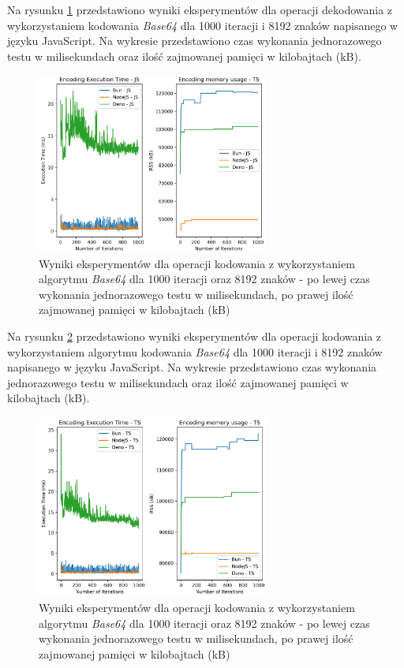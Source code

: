 Na rysunku \ref{fig:decoding_e2_js} przedstawiono wyniki eksperymentów dla operacji dekodowania z wykorzystaniem kodowania \textit{Base64} dla 1000 iteracji i 8192 znaków napisanego w języku JavaScript. Na wykresie przedstawiono czas wykonania jednorazowego testu w milisekundach oraz ilość zajmowanej pamięci w kilobajtach (kB).

\begin{figure}[H]
  \centering
  \includegraphics[width=0.68\textwidth]{Figures/coding/base64_1000_encoding_js.png}
  \caption{Wyniki eksperymentów dla operacji kodowania z wykorzystaniem algorytmu \textit{Base64} dla 1000 iteracji oraz 8192 znaków - po lewej czas wykonania jednorazowego testu w milisekundach, po prawej ilość zajmowanej pamięci w kilobajtach (kB)}
  \label{fig:decoding_e2_js}
\end{figure}

Na rysunku \ref{fig:encoding_e2_ts} przedstawiono wyniki eksperymentów dla operacji kodowania z wykorzystaniem algorytmu kodowania \textit{Base64} dla 1000 iteracji i 8192 znaków napisanego w języku JavaScript. Na wykresie przedstawiono czas wykonania jednorazowego testu w milisekundach oraz ilość zajmowanej pamięci w kilobajtach (kB).

\begin{figure}[H]
  \centering
  \includegraphics[width=0.68\textwidth]{Figures/coding/base64_1000_encoding_ts.png}
  \caption{Wyniki eksperymentów dla operacji kodowania z wykorzystaniem algorytmu \textit{Base64} dla 1000 iteracji oraz 8192 znaków - po lewej czas wykonania jednorazowego testu w milisekundach, po prawej ilość zajmowanej pamięci w kilobajtach (kB)}
  \label{fig:encoding_e2_ts}
\end{figure}

